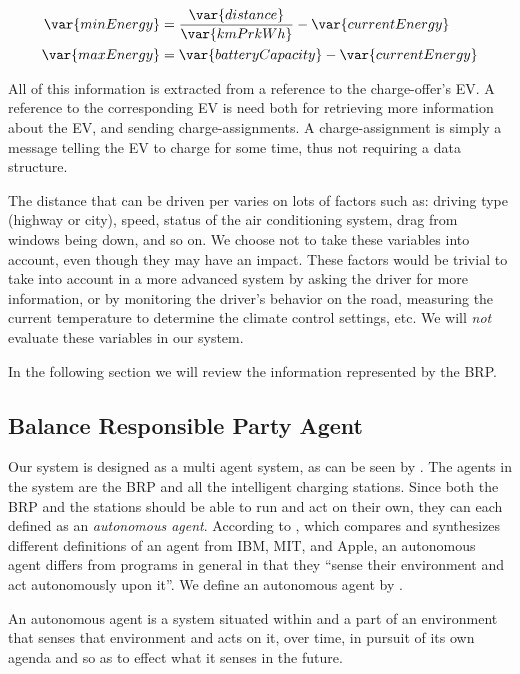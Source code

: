 \begin{subequations}
  \label{eq:minmaxEnergy}
  \begin{align}
    \var{minEnergy} & = \frac{\var{distance}}{\var{kmPrkWh}} - \var{currentEnergy} \label{eq:minEnergy} \\
    \var{maxEnergy} & = \var{batteryCapacity} - \var{currentEnergy} \label{eq:maxEnergy}
  \end{align}
\end{subequations}

All of this information is extracted from a reference to the charge-offer's EV. A reference to the corresponding EV is need both for retrieving more information about the EV, and sending charge-assignments. A charge-assignment is simply a message telling the EV to charge for some time, thus not requiring a data structure. 

The distance that can be driven per \kwh{} varies on lots of factors such as: driving type (highway or city), speed, status of the air conditioning system, drag from windows being down, and so on. We choose not to take these variables into account, even though they may have an impact. These factors would be trivial to take into account in a more advanced system by asking the driver for more information, or by monitoring the driver's behavior on the road, measuring the current temperature to determine the climate control settings, etc. We will \emph{not} evaluate these variables in our system.

In the following section we will review the information represented by the BRP.

\subsection{Balance Responsible Party Agent}\label{sec:brp}
Our system is designed as a multi agent system, as can be seen by . The agents in the system are the BRP and all the intelligent charging stations. Since both the BRP and the stations should be able to run and act on their own, they can each defined as an \emph{autonomous agent}. According to \cite{franklin1997agent}, which compares and synthesizes different definitions of an agent from IBM, MIT, and Apple, an autonomous agent differs from programs in general in that they ``sense their environment and act autonomously upon it''. We define an autonomous agent by .

\begin{definition}\label{def:autoagent}
  An autonomous agent is a system situated within and a part of an environment that senses that environment and acts on it, over time, in pursuit of its own agenda and so as to effect what it senses in the future.\hfill {}
\end{definition}

